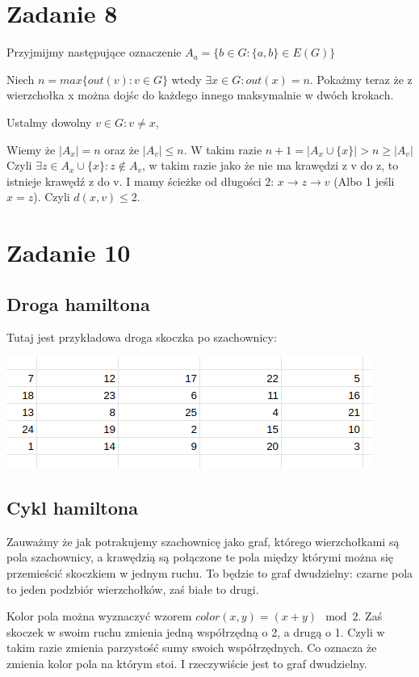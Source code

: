 \documentclass{article}
\begin{document}
\section*{Zadanie 8}
Przyjmijmy następujące oznaczenie $A_a = \{ b \in G : \{a, b\} \in E(G) \}$

Niech $n = max \{out(v) : v \in G \}$ wtedy $\exists x \in G : out(x) = n$. Pokażmy teraz że z wierzchołka x można dojśc do każdego innego maksymalnie w dwóch krokach.

Ustalmy dowolny $v \in G : v \neq x$, 

Wiemy że $|A_x| = n$ oraz że $|A_v| \leq n$. W takim razie $n+1 = |A_x \cup \{x\}| > n \geq |A_v|$ Czyli $\exists z \in A_x \cup \{x\} : z \not\in A_v$, w takim razie jako że nie ma krawędzi z v do z, to istnieje krawędź z do v. I mamy ścieżke od długości 2:  $x \to z \to v$ (Albo 1 jeśli $x = z$). Czyli $d(x,v) \leq 2$.


\section*{Zadanie 10}

\subsection*{Droga hamiltona}
Tutaj jest przykładowa droga skoczka po szachownicy:


\includegraphics{skoczek}
\subsection*{Cykl hamiltona}
Zauważmy że jak potrakujemy szachownicę jako graf, którego wierzchołkami są pola szachownicy, a krawędzią są połączone te pola między którymi można się przemieścić skoczkiem w jednym ruchu. To będzie to graf dwudzielny: czarne pola to jeden podzbiór wierzchołków, zaś białe to drugi. 

Kolor pola można wyznaczyć wzorem $color(x,y) = (x+y) \mod 2$. Zaś skoczek w swoim ruchu zmienia jedną współrzędną o 2, a drugą o 1. Czyli w takim razie zmienia parzystość sumy swoich współrzędnych. Co oznacza że zmienia kolor pola na którym stoi. I rzeczywiście jest to graf dwudzielny.
\end{document}
